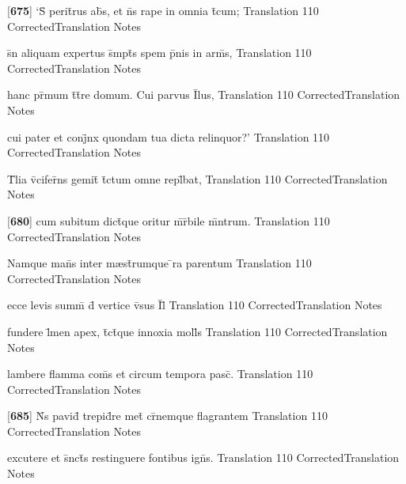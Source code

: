 \latline
  {[\textbf{675}] `S\={\macron {\i}} perit\={}rus ab\={\macron {\i}}s, et n\={}s rape in omnia t\={}cum;}
  { Translation }
  {110}
  { CorrectedTranslation }
  { Notes }


\latline
  {s\={\macron {\i}}n aliquam expertus s\={}mpt\={\macron {\i}}s spem p\={}nis in arm\={\macron {\i}}s,}
  { Translation }
  {110}
  { CorrectedTranslation }
  { Notes }


\latline
  {hanc pr\={\macron {\i}}mum t\={}t\={}re domum.  Cui parvus I\={}lus,}
  { Translation }
  {110}
  { CorrectedTranslation }
  { Notes }


\latline
  {cui pater et conj\={}nx quondam tua dicta relinquor?'}
  { Translation }
  {110}
  { CorrectedTranslation }
  { Notes }


\latline
  {T\={}lia v\={}cifer\={}ns gemit\={} t\={}ctum omne repl\={}bat,}
  { Translation }
  {110}
  { CorrectedTranslation }
  { Notes }


\latline
  {[\textbf{680}] cum subitum dict\={}que oritur m\={\macron {\i}}r\={}bile m\={}ntrum.}
  { Translation }
  {110}
  { CorrectedTranslation }
  { Notes }


\latline
  {Namque man\={}s inter m{\ae}st\={}rumque \={}ra parentum}
  { Translation }
  {110}
  { CorrectedTranslation }
  { Notes }


\latline
  {ecce levis summ\={} d\={} vertice v\={\macron {\i}}sus I\={}l\={\macron {\i}}}
  { Translation }
  {110}
  { CorrectedTranslation }
  { Notes }


\latline
  {fundere l\={}men apex, t\={}ct\={}que innoxia moll\={\macron {\i}}s}
  { Translation }
  {110}
  { CorrectedTranslation }
  { Notes }


\latline
  {lambere flamma com\={}s et circum tempora pasc\={\macron {\i}}.}
  { Translation }
  {110}
  { CorrectedTranslation }
  { Notes }


\latline
  {[\textbf{685}] N\={}s pavid\={\macron {\i}} trepid\={}re met\={} cr\={\macron {\i}}nemque flagrantem}
  { Translation }
  {110}
  { CorrectedTranslation }
  { Notes }


\latline
  {excutere et s\={}nct\={}s restinguere fontibus ign\={\macron {\i}}s.}
  { Translation }
  {110}
  { CorrectedTranslation }
  { Notes }


